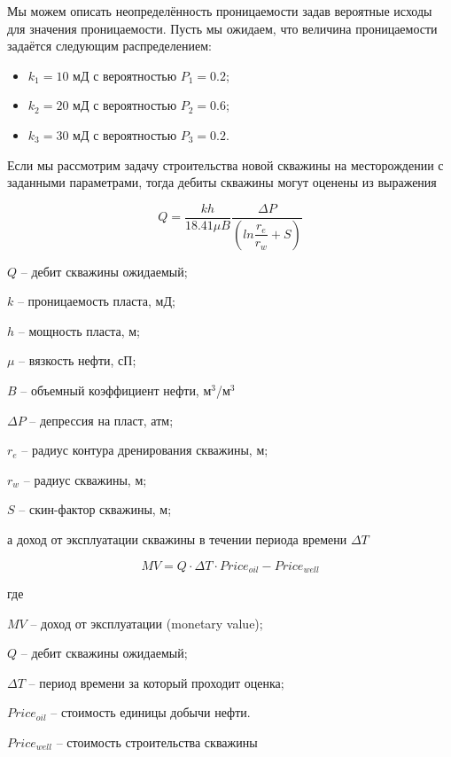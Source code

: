 Мы  можем описать неопределённость проницаемости задав вероятные исходы для значения проницаемости. Пусть мы ожидаем, что величина проницаемости задаётся следующим распределением:

\begin{itemize}
	\item $k_1 = 10$ мД с вероятностью $P_1 = 0.2$; 
	\item $k_2 = 20$ мД с вероятностью $P_2 = 0.6$; 
	\item $k_3 = 30$ мД с вероятностью $P_3 = 0.2$. 
\end{itemize}

Если мы рассмотрим задачу строительства новой скважины на месторождении с заданными параметрами, тогда дебиты скважины могут оценены из выражения

\begin{equation}
	Q = \frac{kh}{18.41 \mu B} \frac{\Delta P}{  \left( ln\dfrac{r_e}{r_w} + S\right) }
	\label{eq:eq_q}
\end{equation}

$Q$ -- дебит скважины ожидаемый;

$k$ -- проницаемость пласта, мД;

$h$ -- мощность пласта, м;

$\mu$ -- вязкость нефти, сП;

$B$ -- объемный коэффициент нефти, м$^3$/м$^3$

$\Delta P$ -- депрессия на пласт, атм;

$r_e$ -- радиус контура дренирования скважины, м;

$r_w$ -- радиус скважины, м;

$S$ -- скин-фактор скважины, м;


а доход от эксплуатации скважины в течении периода времени  $\Delta T$

\begin{equation}
	MV = Q \cdot  \Delta T \cdot  Price_{oil} - Price_{well}
	\label{eq:eq_MV}
\end{equation}

где 

$MV$ -- доход от эксплуатации (monetary value);

$Q$ -- дебит скважины ожидаемый;
 
$\Delta T$ -- период времени за который проходит оценка;

$Price_{oil}$ -- стоимость единицы добычи нефти.

$Price_{well}$ -- стоимость строительства скважины

